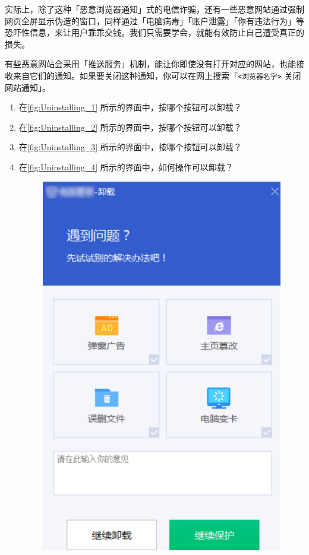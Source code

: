 实际上，除了这种「恶意浏览器通知」式的电信诈骗，还有一些恶意网站通过强制网页全屏显示伪造的窗口，同样通过「电脑病毒」「账户泄露」「你有违法行为」等恐吓性信息，来让用户乖乖交钱。我们只需要学会，就能有效防止自己遭受真正的损失。

\begin{note}
  有些恶意网站会采用「推送服务」机制，能让你即使没有打开对应的网站，也能接收来自它们的通知。如果要关闭这种通知，你可以在网上搜索「\texttt{<浏览器名字>} 关闭网站通知」。
\end{note}

\practice

\begin{enumerate}
  \item 在\autoref{fig:Uninstalling_1} 所示的界面中，按哪个按钮可以卸载？
  \item 在\autoref{fig:Uninstalling_2} 所示的界面中，按哪个按钮可以卸载？
  \item 在\autoref{fig:Uninstalling_3} 所示的界面中，按哪个按钮可以卸载？
  \item 在\autoref{fig:Uninstalling_4} 所示的界面中，如何操作可以卸载？
    \begin{figure}[htb!]
      \centering
      \begin{minipage}{.44\textwidth}
        \centering
        \includegraphics[width=.95\textwidth]{assets/basic/Uninstalling_1.png}

\end{minipage}
\end{figure}
\end{enumerate}
